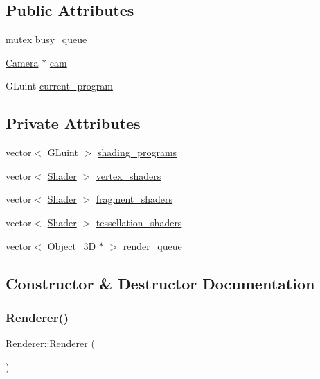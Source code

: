 \subsection*{Public Attributes}
\begin{DoxyCompactItemize}
\item 
mutex \mbox{\hyperlink{classRenderer_a044abbf0e0cbe0446bec0d0f00b2d060}{busy\+\_\+queue}}
\item 
\mbox{\hyperlink{classCamera}{Camera}} $\ast$ \mbox{\hyperlink{classRenderer_a83cc09617ebb267932620bce0a69c540}{cam}}
\item 
G\+Luint \mbox{\hyperlink{classRenderer_a1012d49fe5c011d92d8997c448b2e7ea}{current\+\_\+program}}
\end{DoxyCompactItemize}
\subsection*{Private Attributes}
\begin{DoxyCompactItemize}
\item 
vector$<$ G\+Luint $>$ \mbox{\hyperlink{classRenderer_af6f381484978dd5e3b32f1bf18b37c25}{shading\+\_\+programs}}
\item 
vector$<$ \mbox{\hyperlink{classShader}{Shader}} $>$ \mbox{\hyperlink{classRenderer_a5b8247d261a919a58711df232bf272c5}{vertex\+\_\+shaders}}
\item 
vector$<$ \mbox{\hyperlink{classShader}{Shader}} $>$ \mbox{\hyperlink{classRenderer_a7dd27df94abb2368cb00db0f76ff0c66}{fragment\+\_\+shaders}}
\item 
vector$<$ \mbox{\hyperlink{classShader}{Shader}} $>$ \mbox{\hyperlink{classRenderer_a6d0795a107f8fd1b3ca9af990e5a0928}{tessellation\+\_\+shaders}}
\item 
vector$<$ \mbox{\hyperlink{classObject__3D}{Object\+\_\+3D}} $\ast$ $>$ \mbox{\hyperlink{classRenderer_a87229d10b904562ac9bc629cb576ca5b}{render\+\_\+queue}}
\end{DoxyCompactItemize}


\subsection{Constructor \& Destructor Documentation}
\mbox{\label{classRenderer_a7ebf46f54dab9905f79b80f7fddb76a6}} 
\subsubsection{\texorpdfstring{Renderer()}{Renderer()}\hspace{0.1cm}{\footnotesize\ttfamily [1/2]}}
{\footnotesize\ttfamily Renderer\+::\+Renderer (\begin{DoxyParamCaption}{ }\end{DoxyParamCaption})}

